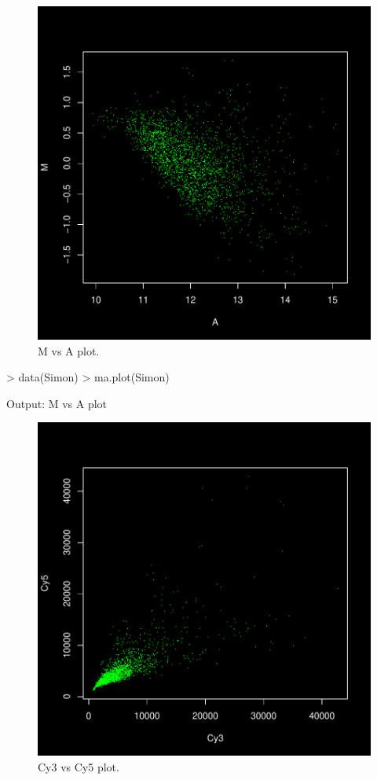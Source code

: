 \documentclass[12pt]{article}
\begin{document}
\begin{figure}[h]
\begin{center}
\includegraphics{example-genArise-007}
\caption{M vs A plot. \label{fig5}}
\end{center}
\end{figure}
\begin{Scode}
> data(Simon)
> ma.plot(Simon)
\end{Scode}
\begin{Soutput}
Output: M vs A plot 
\end{Soutput}
\pagebreak
\begin{figure}[h]
\begin{center}
\includegraphics{example-genArise-008}
\caption{Cy3 vs Cy5 plot. \label{fig6}}
\end{center}
\end{figure}
\end{document}
